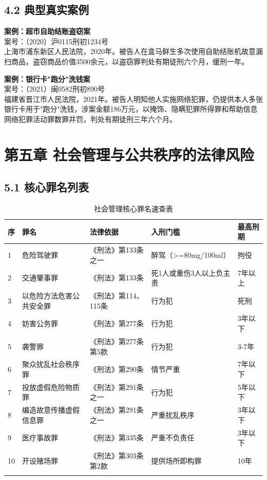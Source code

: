 \documentclass[12pt,a4paper]{article}
\begin{document}
\subsection{4.2 典型真实案例}

\textbf{案例：超市自助结账盗窃案}\\
案号：（2020）沪0115刑初1234号\\
上海市浦东新区人民法院，2020年。被告人在盒马鲜生多次使用自助结账机故意漏扫商品，盗窃商品价值3500余元，以盗窃罪判处有期徒刑六个月，缓刑一年。

\textbf{案例：银行卡"跑分"洗钱案}\\
案号：（2021）闽0582刑初890号\\
福建省晋江市人民法院，2021年。被告人明知他人实施网络犯罪，仍提供本人多张银行卡用于"跑分"洗钱，涉案金额186万元，以掩饰、隐瞒犯罪所得罪和帮助信息网络犯罪活动罪数罪并罚，判处有期徒刑三年六个月。

\clearpage

\section{第五章 社会管理与公共秩序的法律风险}

\subsection{5.1 核心罪名列表}

\begin{longtable}{p{0.5cm}p{4cm}p{3cm}p{3cm}p{2cm}}
  \toprule
  \textbf{序} & \textbf{罪名} & \textbf{法律依据} & \textbf{入刑门槛} & \textbf{最高刑期} \\
  \midrule
  1 & 危险驾驶罪 & 《刑法》第133条之一 & 醉驾（>=80mg/100ml） & 拘役 \\
  2 & 交通肇事罪 & 《刑法》第133条 & 死1人或重伤3人以上负主责 & 7年以上 \\
  3 & 以危险方法危害公共安全罪 & 《刑法》第114、115条 & 行为犯 & 死刑 \\
  4 & 妨害公务罪 & 《刑法》第277条 & 行为犯 & 3年以下 \\
  5 & 袭警罪 & 《刑法》第277条第5款 & 行为犯 & 3-7年 \\
  6 & 聚众扰乱社会秩序罪 & 《刑法》第290条 & 情节严重 & 7年以下 \\
  7 & 投放虚假危险物质罪 & 《刑法》第291条之一 & 行为犯 & 5年以下 \\
  8 & 编造故意传播虚假信息罪 & 《刑法》第291条之一 & 严重扰乱秩序 & 3年以下 \\
  9 & 医疗事故罪 & 《刑法》第335条 & 严重不负责任 & 3年以下 \\
  10 & 开设赌场罪 & 《刑法》第303条第2款 & 提供场所即构罪 & 10年 \\
  \bottomrule
  \caption{社会管理核心罪名速查表}
\end{longtable}
\end{document}
